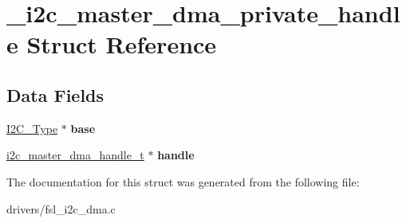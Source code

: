 \hypertarget{struct__i2c__master__dma__private__handle}{}\section{\+\_\+i2c\+\_\+master\+\_\+dma\+\_\+private\+\_\+handle Struct Reference}
\label{struct__i2c__master__dma__private__handle}
\subsection*{Data Fields}
\begin{DoxyCompactItemize}
\item 
\mbox{\label{struct__i2c__master__dma__private__handle_ad4112990808e8c9687aae56feb840f13}} 
\mbox{\hyperlink{struct_i2_c___type}{I2\+C\+\_\+\+Type}} $\ast$ {\bfseries base}
\item 
\mbox{\label{struct__i2c__master__dma__private__handle_a7dfa76503324c661136fc97c9971f476}} 
\mbox{\hyperlink{group__i2c__dma__driver_gab13fb9488effeb728350d3bf8d6c784a}{i2c\+\_\+master\+\_\+dma\+\_\+handle\+\_\+t}} $\ast$ {\bfseries handle}
\end{DoxyCompactItemize}


The documentation for this struct was generated from the following file\+:\begin{DoxyCompactItemize}
\item 
drivers/fsl\+\_\+i2c\+\_\+dma.\+c\end{DoxyCompactItemize}
